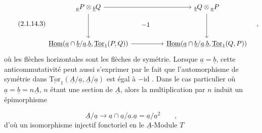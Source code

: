 \begin{equation}\tag{2.1.14.3}
\begin{tikzcd}[column sep=huge, row sep=huge]
{{}_{\underline{a}}P \otimes {}_{\underline{b}}Q} \arrow[r] \arrow[d] \arrow[rd, phantom, "-1" description] & {{}_{\underline{b}}Q \otimes {}_{\underline{a}}P} \arrow[d] \\
{\underline{\mathrm{Hom}}(\underline{a} \cap \underline{b}/\underline{a}.\underline{b},\underline{\mathrm{Tor}}_1(P,Q))} \arrow[r] & {\underline{\mathrm{Hom}}(\underline{a} \cap \underline{b}/\underline{a}.\underline{b},\underline{\mathrm{Tor}}_1(Q,P))}
\end{tikzcd}\quad ,
\end{equation}
où les flèches horizontales sont les flèches de symétrie. Lorsque $\underline{a}=\underline{b}$, cette anticommutativité peut aussi s'exprimer par le fait que l'automorphisme de symétrie dans $\underline{\mathrm{Tor}}_1(\underline{A}/\underline{a},\underline{A}/\underline{a})$ est égal à $-\mathrm{id}$ . Dans le cas particulier où $\underline{a} = \underline{b} = n\underline{A}$, $n$ étant une section de $\underline{A}$, alors la multiplication par $n$ induit un épimorphisme

\begin{equation*}
\underline{A}/\underline{a} \longrightarrow \underline{a} \cap \underline{a}/\underline{a}.\underline{a} = \underline{a}/\underline{a}^2 \qquad ,
\end{equation*}
d'où un isomorphisme injectif fonctoriel en le $\underline{A}$-Module $T$ 


